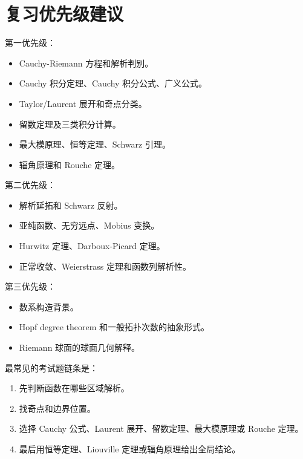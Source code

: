 \documentclass{article}
\begin{document}
\section{复习优先级建议}

第一优先级：

\begin{itemize}
\item
  Cauchy-Riemann 方程和解析判别。
\item
  Cauchy 积分定理、Cauchy 积分公式、广义公式。
\item
  Taylor/Laurent 展开和奇点分类。
\item
  留数定理及三类积分计算。
\item
  最大模原理、恒等定理、Schwarz 引理。
\item
  辐角原理和 Rouche 定理。
\end{itemize}

第二优先级：

\begin{itemize}
\item
  解析延拓和 Schwarz 反射。
\item
  亚纯函数、无穷远点、Mobius 变换。
\item
  Hurwitz 定理、Darboux-Picard 定理。
\item
  正常收敛、Weierstrass 定理和函数列解析性。
\end{itemize}

第三优先级：

\begin{itemize}
\item
  数系构造背景。
\item
  Hopf degree theorem 和一般拓扑次数的抽象形式。
\item
  Riemann 球面的球面几何解释。
\end{itemize}

最常见的考试题链条是：

\begin{enumerate}
\def\labelenumi{\arabic{enumi}.}
\item
  先判断函数在哪些区域解析。
\item
  找奇点和边界位置。
\item
  选择 Cauchy 公式、Laurent 展开、留数定理、最大模原理或 Rouche 定理。
\item
  最后用恒等定理、Liouville 定理或辐角原理给出全局结论。
\end{enumerate}
\end{document}
